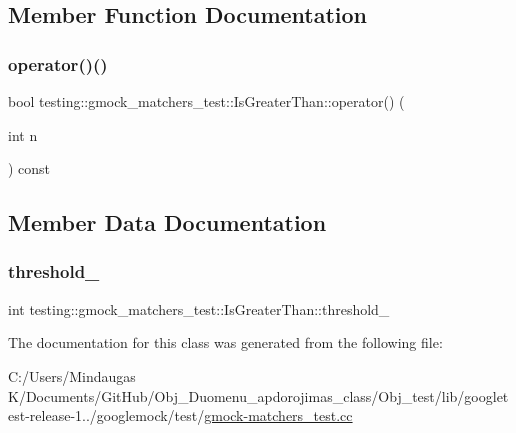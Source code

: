 \subsection{Member Function Documentation}
\mbox{\label{classtesting_1_1gmock__matchers__test_1_1_is_greater_than_a34b455148a2d299c654bc4443db0af67}} 
\subsubsection{\texorpdfstring{operator()()}{operator()()}}
{\footnotesize\ttfamily bool testing\+::gmock\+\_\+matchers\+\_\+test\+::\+Is\+Greater\+Than\+::operator() (\begin{DoxyParamCaption}\item[{int}]{n }\end{DoxyParamCaption}) const\hspace{0.3cm}{\ttfamily [inline]}}



\subsection{Member Data Documentation}
\mbox{\label{classtesting_1_1gmock__matchers__test_1_1_is_greater_than_a053530553cd359c9eb53dd09db0a5805}} 
\subsubsection{\texorpdfstring{threshold\_}{threshold\_}}
{\footnotesize\ttfamily int testing\+::gmock\+\_\+matchers\+\_\+test\+::\+Is\+Greater\+Than\+::threshold\+\_\+\hspace{0.3cm}{\ttfamily [private]}}



The documentation for this class was generated from the following file\+:\begin{DoxyCompactItemize}
\item 
C\+:/\+Users/\+Mindaugas K/\+Documents/\+Git\+Hub/\+Obj\+\_\+\+Duomenu\+\_\+apdorojimas\+\_\+class/\+Obj\+\_\+test/lib/googletest-\/release-\/1../googlemock/test/\mbox{\hyperlink{_obj__test_2lib_2googletest-release-1_88_81_2googlemock_2test_2gmock-matchers__test_8cc}{gmock-\/matchers\+\_\+test.\+cc}}\end{DoxyCompactItemize}
